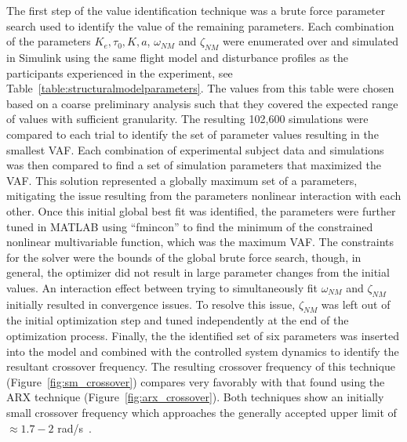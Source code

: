 The first step of the value identification technique was a brute force parameter search used to identify the value of the remaining parameters.
Each combination of the parameters $K_e, \tau_0, K, a$, $\omega_{NM}$ and $\zeta_{NM}$ were enumerated over and simulated in Simulink using the same flight model and disturbance profiles as the participants experienced in the experiment, see Table~\ref{table:structuralmodelparameters}.
The values from this table were chosen based on a coarse preliminary analysis such that they covered the expected range of values with sufficient granularity.
The resulting 102,600 simulations were compared to each trial to identify the set of parameter values resulting in the smallest VAF.
Each combination of experimental subject data and simulations was then compared to find a set of simulation parameters that maximized the VAF.
This solution represented a globally maximum set of a parameters, mitigating the issue resulting from the parameters nonlinear interaction with each other.
Once this initial global best fit was identified, the parameters were further tuned in MATLAB using ``fmincon'' to find the minimum of the constrained nonlinear multivariable function, which was the maximum VAF.
The constraints for the solver were the bounds of the global brute force search, though, in general, the optimizer did not result in large parameter changes from the initial values.
An interaction effect between trying to simultaneously fit $\omega_{NM}$ and $\zeta_{NM}$ initially resulted in convergence issues.
To resolve this issue, $\zeta_{NM}$ was left out of the initial optimization step and tuned independently at the end of the optimization process.
Finally, the the identified set of six parameters was inserted into the model and combined with the controlled system dynamics to identify the resultant crossover frequency.
The resulting crossover frequency of this technique (Figure~\ref{fig:sm_crossover}) compares very favorably with that found using the ARX technique (Figure~\ref{fig:arx_crossover}).
Both techniques show an initially small crossover frequency which approaches the generally accepted upper limit of $\approx 1.7-2$ rad/s~\citep{hess1984analysis}.

